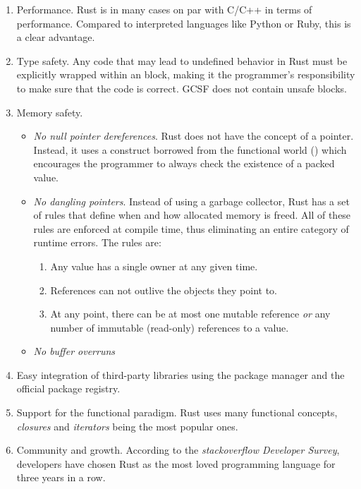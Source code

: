 \begin{enumerate}
  \item Performance. Rust is in many cases on par with C/C++ in terms of performance. Compared to interpreted languages like Python or Ruby, this is a clear advantage.
  \item Type safety. Any code that may lead to undefined behavior in Rust must be explicitly wrapped within an  block, making it the programmer's responsibility to make sure that the code is correct. GCSF does not contain unsafe blocks.
  \item Memory safety.
    \begin{itemize}
      \item \emph{No null pointer dereferences}. Rust does not have the concept of a  pointer. Instead, it uses a construct borrowed from the functional world () which encourages the programmer to always check the existence of a packed value.
      \item \emph{No dangling pointers}. Instead of using a garbage collector, Rust has a set of rules that define when and how allocated memory is freed. All of these rules are enforced at compile time, thus eliminating an entire category of runtime errors. The rules are:
      \begin{enumerate}
        \item Any value has a single owner at any given time.
        \item References can not outlive the objects they point to.
        \item At any point, there can be at most one mutable reference \emph{or} any number of immutable (read-only) references to a value.
      \end{enumerate}
      \item \emph{No buffer overruns}
    \end{itemize}
  \item Easy integration of third-party libraries using the  package manager and the official package registry\cite{crates_io}.
  \item Support for the functional paradigm. Rust uses many functional concepts, \emph{closures} and \emph{iterators} being the most popular ones.
  \item Community and growth. According to the \emph{stackoverflow Developer Survey}\cite{stack_overflow_most_loved}, developers have chosen Rust as the most loved programming language for three years in a row.
\end{enumerate}

